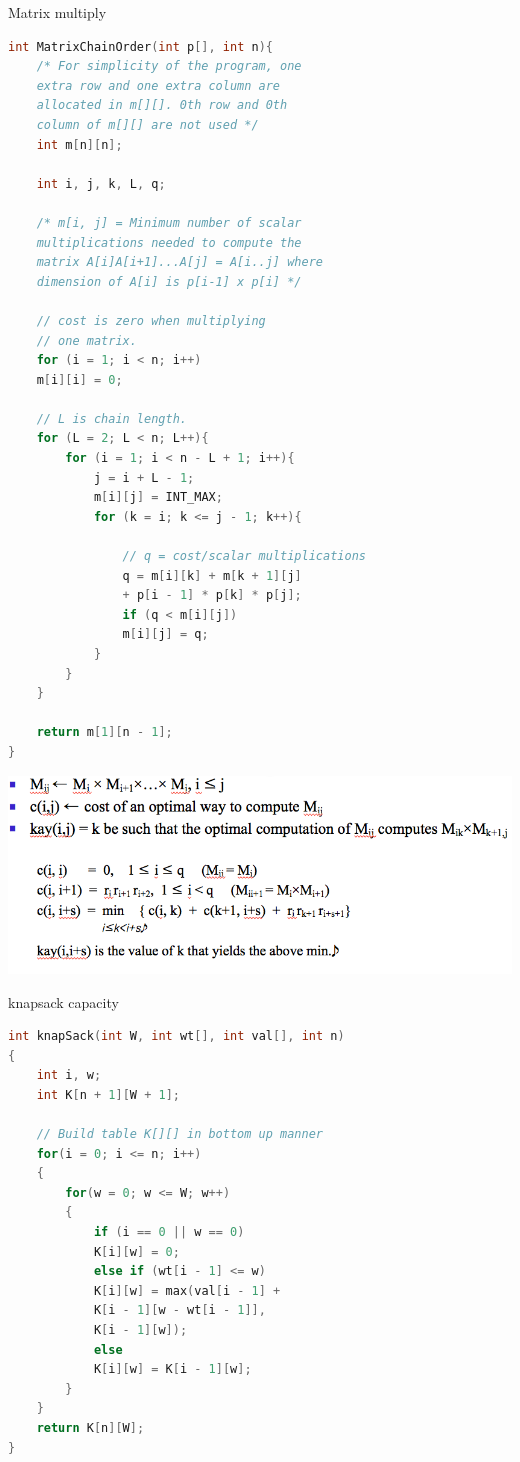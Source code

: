 \documentclass[a4paper,11pt,twoside]{book}
\begin{document}
	
	\par Matrix multiply 
\begin{lstlisting}[frame=single, language=c++]
int MatrixChainOrder(int p[], int n){
	/* For simplicity of the program, one
	extra row and one extra column are
	allocated in m[][]. 0th row and 0th
	column of m[][] are not used */
	int m[n][n];
	
	int i, j, k, L, q;
	
	/* m[i, j] = Minimum number of scalar
	multiplications needed to compute the
	matrix A[i]A[i+1]...A[j] = A[i..j] where
	dimension of A[i] is p[i-1] x p[i] */
	
	// cost is zero when multiplying
	// one matrix.
	for (i = 1; i < n; i++)
	m[i][i] = 0;
	
	// L is chain length.
	for (L = 2; L < n; L++){
		for (i = 1; i < n - L + 1; i++){
			j = i + L - 1;
			m[i][j] = INT_MAX;
			for (k = i; k <= j - 1; k++){
				
				// q = cost/scalar multiplications
				q = m[i][k] + m[k + 1][j]
				+ p[i - 1] * p[k] * p[j];
				if (q < m[i][j])
				m[i][j] = q;
			}
		}
	}
	
	return m[1][n - 1];
}		
\end{lstlisting}

	\begin{center}
	\includegraphics[scale=0.45]{pics/Recurrence.png} 
\end{center}	
	
	\par knapsack capacity
\begin{lstlisting}[frame=single, language=c++]
int knapSack(int W, int wt[], int val[], int n)
{
	int i, w;
	int K[n + 1][W + 1];
	
	// Build table K[][] in bottom up manner
	for(i = 0; i <= n; i++)
	{
		for(w = 0; w <= W; w++)
		{
			if (i == 0 || w == 0)
			K[i][w] = 0;
			else if (wt[i - 1] <= w)
			K[i][w] = max(val[i - 1] +
			K[i - 1][w - wt[i - 1]],
			K[i - 1][w]);
			else
			K[i][w] = K[i - 1][w];
		}
	}
	return K[n][W];
}		
\end{lstlisting}	
	
\end{document}
